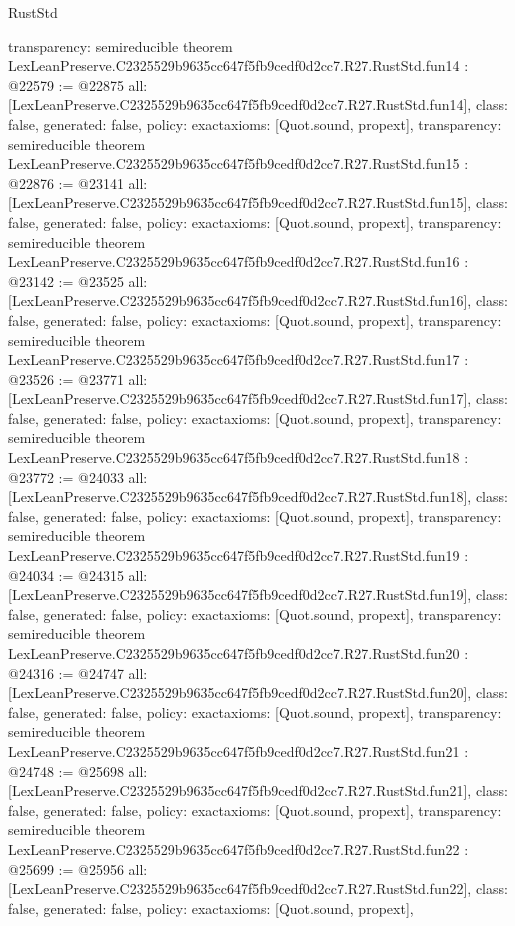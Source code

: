 \begin{lexlean}{RustStd}
\begin{coremodule}
{  transparency: semireducible
}
theorem LexLeanPreserve.C2325529b9635cc647f5fb9cedf0d2cc7.R27.RustStd.fun14 : @22579 := @22875 {
  all: [LexLeanPreserve.C2325529b9635cc647f5fb9cedf0d2cc7.R27.RustStd.fun14],
  class: false,
  generated: false,
  policy: exact{axioms: [Quot.sound, propext]},
  transparency: semireducible
}
theorem LexLeanPreserve.C2325529b9635cc647f5fb9cedf0d2cc7.R27.RustStd.fun15 : @22876 := @23141 {
  all: [LexLeanPreserve.C2325529b9635cc647f5fb9cedf0d2cc7.R27.RustStd.fun15],
  class: false,
  generated: false,
  policy: exact{axioms: [Quot.sound, propext]},
  transparency: semireducible
}
theorem LexLeanPreserve.C2325529b9635cc647f5fb9cedf0d2cc7.R27.RustStd.fun16 : @23142 := @23525 {
  all: [LexLeanPreserve.C2325529b9635cc647f5fb9cedf0d2cc7.R27.RustStd.fun16],
  class: false,
  generated: false,
  policy: exact{axioms: [Quot.sound, propext]},
  transparency: semireducible
}
theorem LexLeanPreserve.C2325529b9635cc647f5fb9cedf0d2cc7.R27.RustStd.fun17 : @23526 := @23771 {
  all: [LexLeanPreserve.C2325529b9635cc647f5fb9cedf0d2cc7.R27.RustStd.fun17],
  class: false,
  generated: false,
  policy: exact{axioms: [Quot.sound, propext]},
  transparency: semireducible
}
theorem LexLeanPreserve.C2325529b9635cc647f5fb9cedf0d2cc7.R27.RustStd.fun18 : @23772 := @24033 {
  all: [LexLeanPreserve.C2325529b9635cc647f5fb9cedf0d2cc7.R27.RustStd.fun18],
  class: false,
  generated: false,
  policy: exact{axioms: [Quot.sound, propext]},
  transparency: semireducible
}
theorem LexLeanPreserve.C2325529b9635cc647f5fb9cedf0d2cc7.R27.RustStd.fun19 : @24034 := @24315 {
  all: [LexLeanPreserve.C2325529b9635cc647f5fb9cedf0d2cc7.R27.RustStd.fun19],
  class: false,
  generated: false,
  policy: exact{axioms: [Quot.sound, propext]},
  transparency: semireducible
}
theorem LexLeanPreserve.C2325529b9635cc647f5fb9cedf0d2cc7.R27.RustStd.fun20 : @24316 := @24747 {
  all: [LexLeanPreserve.C2325529b9635cc647f5fb9cedf0d2cc7.R27.RustStd.fun20],
  class: false,
  generated: false,
  policy: exact{axioms: [Quot.sound, propext]},
  transparency: semireducible
}
theorem LexLeanPreserve.C2325529b9635cc647f5fb9cedf0d2cc7.R27.RustStd.fun21 : @24748 := @25698 {
  all: [LexLeanPreserve.C2325529b9635cc647f5fb9cedf0d2cc7.R27.RustStd.fun21],
  class: false,
  generated: false,
  policy: exact{axioms: [Quot.sound, propext]},
  transparency: semireducible
}
theorem LexLeanPreserve.C2325529b9635cc647f5fb9cedf0d2cc7.R27.RustStd.fun22 : @25699 := @25956 {
  all: [LexLeanPreserve.C2325529b9635cc647f5fb9cedf0d2cc7.R27.RustStd.fun22],
  class: false,
  generated: false,
  policy: exact{axioms: [Quot.sound, propext]},
}
\end{coremodule}
\end{lexlean}
